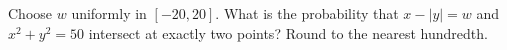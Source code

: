 Choose $w$ uniformly in $[-20,20]$. What is the probability that $x-|y|=w$ and $x^2+y^2=50$ intersect at exactly two points? Round to the nearest hundredth.
